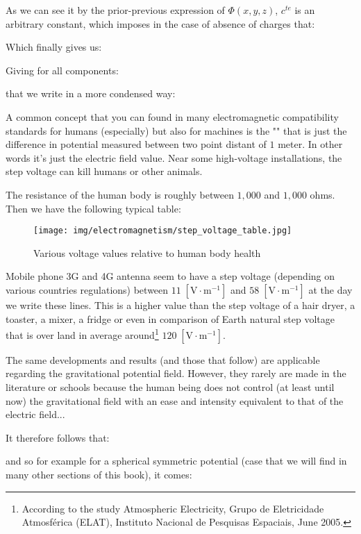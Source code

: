 	As we can see it by the prior-previous expression of $\Phi(x,y,z)$, $c^{te}$ is an arbitrary constant, which imposes in the case of absence of charges that:
	
	Which finally gives us:
	
	Giving for all components:
	
	that we write in a more condensed way\label{derivation of electric field by the potential}:
	
	A common concept that you can found in many electromagnetic compatibility standards for humans (especially) but also for machines is the "" that is just the difference in potential measured between two point distant of $1$ meter. In other words it's just the electric field value. Near some high-voltage installations, the step voltage can kill humans or other animals.
	
	The resistance of the human body is roughly between $1,000$ and $1,000$ ohms. Then we have the following typical table:
	\begin{figure}[H]
		\centering
		\texttt{[image: img/electromagnetism/step\_voltage\_table.jpg]}
		\caption{Various voltage values relative to human body health}
	\end{figure}
	Mobile phone 3G and 4G antenna seem to have a step voltage (depending on various countries regulations) between $11\;[\text{V}\cdot\text{m}^{-1}]$ and $58\;[\text{V}\cdot\text{m}^{-1}]$ at the day we write these lines. This is a higher value than the step voltage of a hair dryer, a toaster, a mixer, a fridge or even in comparison of Earth natural step voltage that is over land in average around\footnote{According to the study Atmospheric Electricity, Grupo de Eletricidade Atmosférica (ELAT), Instituto Nacional de Pesquisas Espaciais, June 2005.} $120\;[\text{V}\cdot\text{m}^{-1}]$.
	
	\begin{tcolorbox}[title=Remark,colframe=black,arc=10pt]
	The same developments and results (and those that follow) are applicable regarding the gravitational potential field. However, they rarely are made in the literature or schools because the human being does not control (at least until now) the gravitational field with an ease and intensity equivalent to that of the electric field...
	\end{tcolorbox}
	It therefore follows that:
	
	and so for example for a spherical symmetric potential (case that we will find in many other sections of this book), it comes:
	
